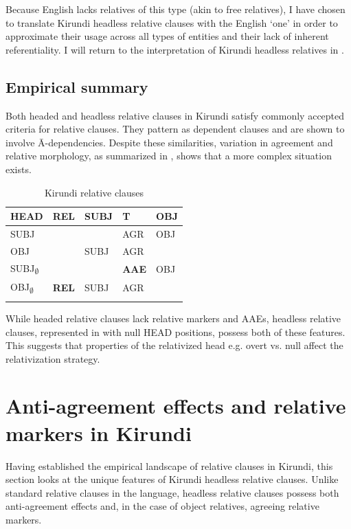\documentclass[output=paper,colorlinks,citecolor=brown
]{langscibook}
\begin{document}
\noindent Because English lacks relatives of this type (akin to free relatives), I have chosen to translate Kirundi headless relative clauses with the English `one' in order to approximate their usage across all types of entities and their lack of inherent referentiality. I will return to the interpretation of Kirundi headless relatives in .


\subsection{Empirical summary} \label{sec:myers:empsum}

Both headed and headless relative clauses in Kirundi satisfy commonly accepted criteria for relative clauses. They pattern as dependent clauses and are shown to involve Ā-dependencies. Despite these similarities, variation in agreement and relative morphology, as summarized in , shows that a more complex situation exists.

\begin{table}
\caption{Kirundi relative clauses}
\label{tab:myers:empsum}
 \begin{tabular}{lllll}
  \lsptoprule
HEAD & REL & SUBJ & T & OBJ\\
  \midrule
  SUBJ     &  & & AGR & OBJ  \\
OBJ      &  & SUBJ & AGR &  \\ 
 \rowcolor{lightgray}  SUBJ\textsubscript{$\emptyset$}   &  & & \textbf{AAE} & OBJ  \\
  \rowcolor{lightgray}   OBJ\textsubscript{$\emptyset$} & \textbf{REL} & SUBJ & AGR &  \\
  \lspbottomrule
 \end{tabular}
\end{table}

While headed relative clauses lack relative markers and AAEs, headless relative clauses, represented in  with null HEAD positions, possess both of these features. This suggests that properties of the relativized head \textendash{} e.g. overt vs. null \textendash{} affect the relativization strategy.



\section{Anti-agreement effects and relative markers in Kirundi} \label{sec:myers:aaes}
Having established the empirical landscape of relative clauses in Kirundi, this section looks at the unique features of Kirundi headless relative clauses. Unlike standard relative clauses in the language, headless relative clauses possess both anti-agreement effects and, in the case of object relatives, agreeing relative markers.
\end{document}
